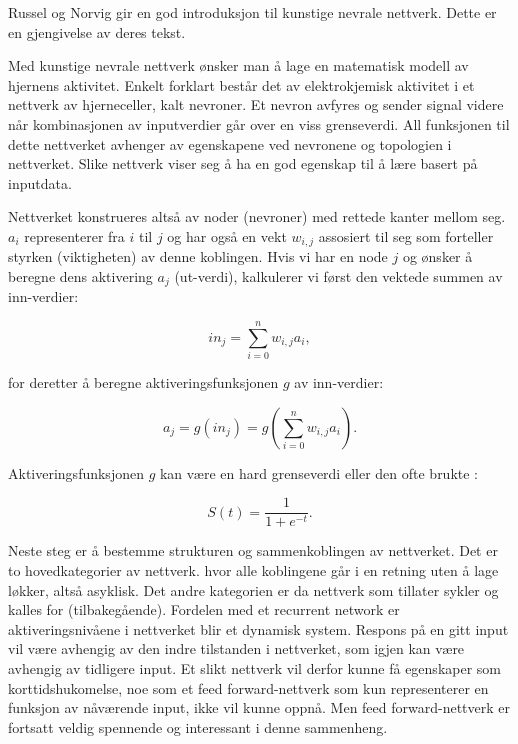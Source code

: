 Russel og Norvig \cite{Russel2010} gir en god introduksjon til kunstige nevrale nettverk. Dette er en gjengivelse av deres tekst.

Med kunstige nevrale nettverk ønsker man å lage en matematisk modell av hjernens aktivitet. Enkelt forklart består det av elektrokjemisk aktivitet i et nettverk av hjerneceller, kalt nevroner. Et nevron avfyres og sender signal videre når kombinasjonen av inputverdier går over en viss grenseverdi. All funksjonen til dette nettverket avhenger av egenskapene ved nevronene og topologien i nettverket. Slike nettverk viser seg å ha en god egenskap til å lære basert på inputdata.

Nettverket konstrueres altså av noder (nevroner) med rettede kanter mellom seg. $a_i$ representerer  fra $i$ til $j$ og har også en vekt $w_{i,j}$ assosiert til seg som forteller styrken (viktigheten) av denne koblingen. Hvis vi har en node $j$ og ønsker å beregne dens aktivering $a_j$ (ut-verdi), kalkulerer vi først den vektede summen av inn-verdier:

\begin{equation}
in_{j} = \sum_{i=0}^n w_{i,j}a_{i},
\end{equation}

for deretter å beregne aktiveringsfunksjonen $g$ av inn-verdier:

\begin{equation}
a_{j} = g(in_{j}) = g(\sum_{i=0}^n w_{i,j}a_{i}).
\end{equation}

Aktiveringsfunksjonen $g$ kan være en hard grenseverdi eller den ofte brukte :

\begin{equation}
S(t) = \frac{1}{1+e^{-t}}.
\end{equation}

Neste steg er å bestemme strukturen og sammenkoblingen av nettverket. Det er to hovedkategorier av nettverk.  hvor alle koblingene går i en retning uten å lage løkker, altså asyklisk. Det andre kategorien er da nettverk som tillater sykler og kalles for  (tilbakegående). Fordelen med et recurrent network er aktiveringsnivåene i nettverket blir et dynamisk system. Respons på en gitt input vil være avhengig av den indre tilstanden i nettverket, som igjen kan være avhengig av tidligere input. Et slikt nettverk vil derfor kunne få egenskaper som korttidshukomelse, noe som et feed forward-nettverk som kun representerer en funksjon av nåværende input, ikke vil kunne oppnå. Men feed forward-nettverk er fortsatt veldig spennende og interessant i denne sammenheng.

